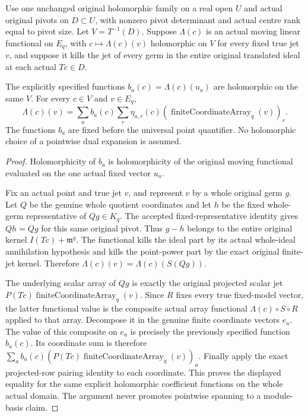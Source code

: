 \begin{theorem}
\label{hir:actual-holomorphic-true-jet-annihilator-generation}
\leanok
Use one unchanged original holomorphic family on a real open $U$ and
actual original pivots on $D\subset U$, with nonzero pivot determinant
and actual centre rank equal to pivot size. Let $V=T^{-1}(D)$. Suppose
$\Lambda(c)$ is an actual moving linear functional on $E_q$, with
$c\mapsto\Lambda(c)(v)$ holomorphic on $V$ for every fixed true jet
$v$, and suppose it kills the jet of every germ in the entire original
translated ideal at each actual $Tc\in D$.

The explicitly specified functions $b_a(c)=\Lambda(c)(u_a)$ are
holomorphic on the same $V$. For every $c\in V$ and $v\in E_q$,
\[
 \Lambda(c)(v)=\sum_a b_a(c)\sum_r\eta_{a,r}(c)
      (\operatorname{finiteCoordinateArray}_q(v))_r.
\]
The functions $b_a$ are fixed before the universal point quantifier.
No holomorphic choice of a pointwise dual expansion is assumed.
\end{theorem}
\begin{proof}
Holomorphicity of $b_a$ is holomorphicity of the original moving
functional evaluated on the one actual fixed vector $u_a$.

Fix an actual point and true jet $v$, and represent $v$ by a whole
original germ $g$. Let $Q$ be the genuine whole quotient coordinates
and let $h$ be the fixed whole-germ representative of $Qg\in K_q$.
The accepted fixed-representative identity gives $Qh=Qg$ for this
same original pivot. Thus $g-h$ belongs to the entire original kernel
$I(Tc)+\mathfrak m^q$. The functional kills the ideal part by its
actual whole-ideal annihilation hypothesis and kills the point-power
part by the exact original finite-jet kernel. Therefore
$\Lambda(c)(v)=\Lambda(c)(S(Qg))$.

The underlying scalar array of $Qg$ is exactly the original projected
scalar jet $P(Tc)\operatorname{finiteCoordinateArray}_q(v)$. Since
$R$ fixes every true fixed-model vector, the latter functional value
is the composite actual array functional $\Lambda(c)\circ S\circ R$
applied to that array. Decompose it in the genuine finite coordinate
vectors $e_a$. The value of this composite on $e_a$ is precisely the
previously specified function $b_a(c)$. Its coordinate sum is therefore
$\sum_a b_a(c)(P(Tc)\operatorname{finiteCoordinateArray}_q(v))_a$.
Finally apply the exact projected-row pairing identity to each
coordinate. This proves the displayed equality for the same explicit
holomorphic coefficient functions on the whole actual domain. The
argument never promotes pointwise spanning to a module-basis claim.
\end{proof}

